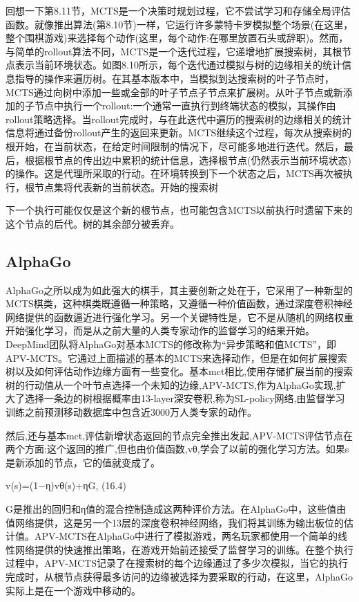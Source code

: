 回想一下第8.11节，MCTS是一个决策时规划过程，它不尝试学习和存储全局评估函数。就像推出算法(第8.10节)一样，它运行许多蒙特卡罗模拟整个场景(在这里，整个围棋游戏)来选择每个动作(这里，每个动作:在哪里放置石头或辞职)。然而，与简单的rollout算法不同，MCTS是一个迭代过程，它递增地扩展搜索树，其根节点表示当前环境状态。如图8.10所示，每个迭代通过模拟与树的边缘相关的统计信息指导的操作来遍历树。在其基本版本中，当模拟到达搜索树的叶子节点时，MCTS通过向树中添加一些或全部的叶子节点子节点来扩展树。从叶子节点或新添加的子节点中执行一个rollout:一个通常一直执行到终端状态的模拟，其操作由rollout策略选择。当rollout完成时，与在此迭代中遍历的搜索树的边缘相关的统计信息将通过备份rollout产生的返回来更新。MCTS继续这个过程，每次从搜索树的根开始，在当前状态，在给定时间限制的情况下，尽可能多地进行迭代。然后，最后，根据根节点的传出边中累积的统计信息，选择根节点(仍然表示当前环境状态)的操作。这是代理所采取的行动。在环境转换到下一个状态之后，MCTS再次被执行，根节点集将代表新的当前状态。开始的搜索树

下一个执行可能仅仅是这个新的根节点，也可能包含MCTS以前执行时遗留下来的这个节点的后代。树的其余部分被丢弃。


\subsection{AlphaGo}
AlphaGo之所以成为如此强大的棋手，其主要创新之处在于，它采用了一种新型的MCTS棋类，这种棋类既遵循一种策略，又遵循一种价值函数，通过深度卷积神经网络提供的函数逼近进行强化学习。另一个关键特性是，它不是从随机的网络权重开始强化学习，而是从之前大量的人类专家动作的监督学习的结果开始。
DeepMind团队将AlphaGo对基本MCTS的修改称为“异步策略和值MCTS”，即APV-MCTS。它通过上面描述的基本的MCTS来选择动作，但是在如何扩展搜索树以及如何评估动作边缘方面有一些变化。基本mct相比,使用存储扩展当前的搜索树的行动值从一个叶节点选择一个未知的边缘,APV-MCTS,作为AlphaGo实现,扩大了选择一条边的树根据概率由13-layer深安卷积,称为SL-policy网络,由监督学习训练之前预测移动数据库中包含近3000万人类专家的动作。

然后,还与基本mct,评估新增状态返回的节点完全推出发起,APV-MCTS评估节点在两个方面:这个返回的推广,但也由价值函数,vθ,学会了以前的强化学习方法。如果s是新添加的节点，它的值就变成了。

v(s)=(1−η)vθ(s)+ηG, 					(16.4)

G是推出的回归和η值的混合控制造成这两种评价方法。在AlphaGo中，这些值由值网络提供，这是另一个13层的深度卷积神经网络，我们将其训练为输出板位的估计值。APV-MCTS在AlphaGo中进行了模拟游戏，两名玩家都使用一个简单的线性网络提供的快速推出策略，在游戏开始前还接受了监督学习的训练。在整个执行过程中，APV-MCTS记录了在搜索树的每个边缘通过了多少次模拟，当它的执行完成时，从根节点获得最多访问的边缘被选择为要采取的行动，在这里，AlphaGo实际上是在一个游戏中移动的。

